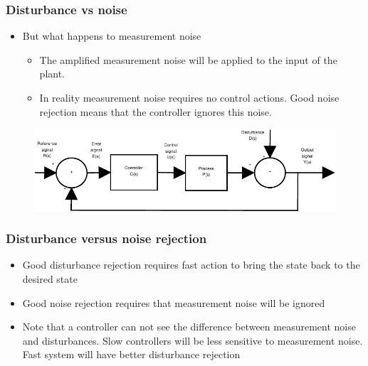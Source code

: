 \begin{frame}
	\frametitle{Disturbance vs noise}
	\begin{itemize}
		\item But what happens to measurement noise
		\begin{itemize}
			\item The amplified measurement noise will be applied to the input of the plant.
			\item In reality measurement noise requires no control actions. Good noise rejection means that the controller ignores this noise.
		\end{itemize}
	\end{itemize}
	\begin{figure}
\centering
\includegraphics[width=0.7\linewidth]{Closed-Loop}
\label{fig:Closed-Loop5}
\end{figure}
\end{frame}


\begin{frame}
	\frametitle{Disturbance versus noise rejection}
	\begin{itemize}
		\item Good disturbance rejection requires fast action to bring the state back to the desired state
		\item Good noise rejection requires that measurement noise will be ignored
		\item Note that a controller can not see the difference between measurement noise and disturbances. Slow controllers will be less sensitive to measurement noise. Fast system will have better disturbance rejection
	\end{itemize}
\end{frame}

\newcommand{\specialcell}[2][c]{%
	\begin{tabular}[#1]{@{}c@{}}#2\end{tabular}}
